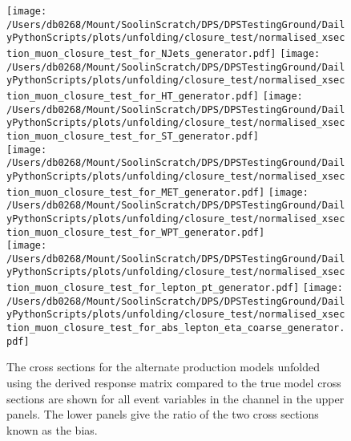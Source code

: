 \begin{figure*}[htpb]
	\centering
	\texttt{[image: /Users/db0268/Mount/SoolinScratch/DPS/DPSTestingGround/DailyPythonScripts/plots/unfolding/closure\_test/normalised\_xsection\_muon\_closure\_test\_for\_NJets\_generator.pdf]}
	\texttt{[image: /Users/db0268/Mount/SoolinScratch/DPS/DPSTestingGround/DailyPythonScripts/plots/unfolding/closure\_test/normalised\_xsection\_muon\_closure\_test\_for\_HT\_generator.pdf]}
	\texttt{[image: /Users/db0268/Mount/SoolinScratch/DPS/DPSTestingGround/DailyPythonScripts/plots/unfolding/closure\_test/normalised\_xsection\_muon\_closure\_test\_for\_ST\_generator.pdf]} \\
	\texttt{[image: /Users/db0268/Mount/SoolinScratch/DPS/DPSTestingGround/DailyPythonScripts/plots/unfolding/closure\_test/normalised\_xsection\_muon\_closure\_test\_for\_MET\_generator.pdf]} 
	\texttt{[image: /Users/db0268/Mount/SoolinScratch/DPS/DPSTestingGround/DailyPythonScripts/plots/unfolding/closure\_test/normalised\_xsection\_muon\_closure\_test\_for\_WPT\_generator.pdf]} \\
	\texttt{[image: /Users/db0268/Mount/SoolinScratch/DPS/DPSTestingGround/DailyPythonScripts/plots/unfolding/closure\_test/normalised\_xsection\_muon\_closure\_test\_for\_lepton\_pt\_generator.pdf]} 
	\texttt{[image: /Users/db0268/Mount/SoolinScratch/DPS/DPSTestingGround/DailyPythonScripts/plots/unfolding/closure\_test/normalised\_xsection\_muon\_closure\_test\_for\_abs\_lepton\_eta\_coarse\_generator.pdf]} \\
	\caption[The cross sections for the alternate \ttbar{} production models unfolded using the \powhegpythia{} derived response matrix compared to the true model cross sections are shown for all event variables in the \muJets{} channel in the upper panels. The lower panels give the ratio of the two cross sections known as the bias.]{The cross sections for the alternate \ttbar{} production models unfolded using the \powhegpythia{} derived response matrix compared to the true model cross sections are shown for all event variables in the \muJets{} channel in the upper panels. The lower panels give the ratio of the two cross sections known as the bias.}
	\label{fig:ClosureBiasmu2}
\end{figure*}

